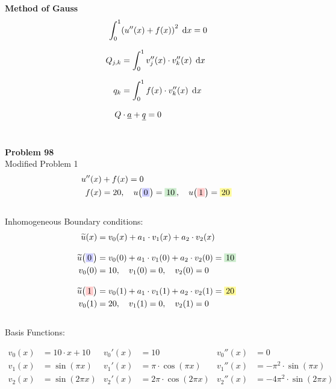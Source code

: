 \documentclass[
final,
a4paper,
oneside,
parskip=full,
headings=standardclasses,
headings=big,
pointednumbers,
fleqn
]{scrartcl}
\newcommand{\tfillb}[1]{\tfillc[#1][blue!20]}
\newcommand{\tfillg}[1]{\tfillc[#1][Green!20]}
\newcommand{\tfilly}[1]{\tfillc[#1][yellow!40]}
\newcommand{\tfillr}[1]{\tfillc[#1][red!20]}
\newcommand*\difx{\; \mathop{}\!\mathrm{d}x}
\newcommand{\kl}[1]{{\left( #1 \right)}}
\begin{document}
    {\bf{Method of Gauss}} \\
    {\setlength{\abovedisplayskip}{-6pt}
    \setlength{\belowdisplayskip}{-12pt}
    \begin{align*}
        \int_{0}^{1}&{\kl{u''\kl{x} + f\kl{x}}^2 \difx} = 0  \\[0.25cm]
        Q_{j,k} & = \int_{0}^{1}{v_j''\kl{x} \cdot v_k''\kl{x} \difx}  \\[0.25cm]
        q_k & = \int_{0}^{1}{f\kl{x} \cdot v_k''\kl{x} \difx}   \\[0.25cm]
        Q &\cdot \uline{a} + \uline{q} = 0
    \end{align*}} \\
    
    
    \newpage
    
    {\bf{Problem 98}} \\
    Modified Problem 1 \\
    {\setlength{\abovedisplayskip}{-12pt}
    \setlength{\belowdisplayskip}{-6pt}
    \begin{align*}
    u''\kl{x} &+ f\kl{x} = 0 \\
    f\kl{x} &= 20, \quad u\kl{\tfillb{$0$}} = \tfillg{$10$} , \quad u\kl{\tfillr{$1$}} = \tfilly{$20$}
    \end{align*}} \\
    Inhomogeneous Boundary conditions: \\
    {\setlength{\abovedisplayskip}{-12pt}
    \setlength{\belowdisplayskip}{-22pt}
    \begin{align*}
    \widetilde{u}\kl{x} & = v_0\kl{x} + a_1 \cdot v_1\kl{x} + a_2 \cdot v_2\kl{x} \\[0.3cm]
    \widetilde{u}\kl{\tfillb{$0$}} & = v_0\kl{0} + a_1 \cdot v_1\kl{0} + a_2 \cdot v_2\kl{0} = \tfillg{$10$}\\
    v_0\kl{0} &= 10, \quad v_1\kl{0} = 0, \quad v_2\kl{0} = 0\\[0.3cm]
    \widetilde{u}\kl{\tfillr{$1$}} & = v_0\kl{1} + a_1 \cdot v_1\kl{1} + a_2 \cdot v_2\kl{1} = \tfilly{$20$}\\
    v_0\kl{1} &= 20, \quad v_1\kl{1} = 0, \quad v_2\kl{1} = 0\\
    \end{align*}} \\
    Basis Functions: \\
    \begin{minipage}{0.6\textwidth}
        \setlength{\abovedisplayskip}{0pt}
        \setlength{\belowdisplayskip}{-12pt}
        \begin{align*}
        v_0\kl{x} &= 10 \cdot x + 10    &v_0'\kl{x} &= 10                            &v_0''\kl{x} &= 0 \\
        v_1\kl{x} &= \sin\kl{\pi x}     &v_1'\kl{x} &= \pi \cdot \cos\kl{\pi x}      &v_1''\kl{x} &= -\pi^2 \cdot \sin\kl{\pi x}\\
        v_2\kl{x} &= \sin\kl{2 \pi x}   &v_2'\kl{x} &= 2 \pi \cdot \cos\kl{2 \pi x}  &v_2''\kl{x} &= -4 \pi^2 \cdot \sin\kl{2 \pi x}
        \end{align*}
    \end{minipage}
\end{document}
